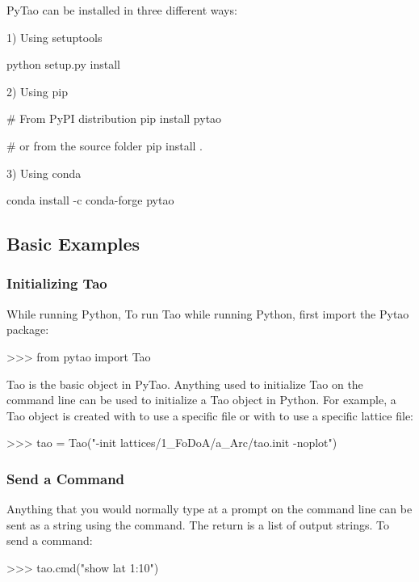 \documentclass{hitec}     %
\begin{document}
{{{{PyTao can be installed in three different ways:

1) Using setuptools
\begin{code}
python setup.py install
\end{code}

2) Using pip
\begin{code}
# From PyPI distribution
pip install pytao

# or from the source folder
pip install .

\end{code}

3) Using conda
\begin{code}
conda install -c conda-forge pytao
\end{code}

\subsection{Basic Examples}

\subsubsection{Initializing Tao}
While running Python,
To run Tao while running Python, first import the Pytao package:
\begin{code}
>>> from pytao import Tao
\end{code}

Tao is the basic object in PyTao. Anything used to initialize Tao on the command line can be used to initialize a Tao object in Python. For example, a Tao object is created with  to use a specific  file or with  to use a specific lattice file:
\begin{code}
>>> tao = Tao("-init lattices/1_FoDoA/a_Arc/tao.init -noplot")
\end{code}

\subsubsection{Send a Command}
Anything that you would normally type at a  prompt on the command line can be sent as a string using the  command. The return is a list of output strings. To send a command:
\begin{code}
>>> tao.cmd("show lat 1:10")
\end{code}

}}}}
\end{document}
